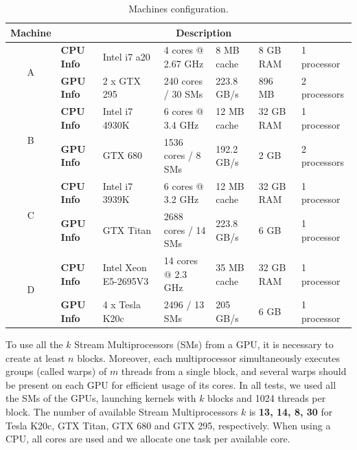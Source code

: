 \documentclass[journal]{IEEEtran}
\begin{document}
\begin{table}[t]
\begin{scriptsize}
\caption{Machines configuration.\label{table:machines}}
\begin{center}

\begin{tabular}{|c|l|l|l|l|l|l|} \hline
\multicolumn{1}{|l|}{Machine} & \multicolumn{6}{|c|}{\textbf{Description}}                                                           \\ \hline
\multirow{2}{*}{A}          & \textbf{CPU Info} & Intel i7 a20   & 4 cores  @ 2.67 GHz  &   8 MB cache   & 8 GB RAM   & 1 processor  \\ \cline{2-7}
                            & \textbf{GPU Info} & 2 x GTX 295    & 240 cores / 30 SMs      & 223.8 GB/s  & 896 MB          & 2 processors \\ \hline
\multirow{2}{*}{B}          & \textbf{CPU Info} & Intel i7 4930K & 6 cores    @ 3.4 GHz & 12 MB cache       & 32 GB RAM        & 1 processor  \\  \cline{2-7}
                            & \textbf{GPU Info} & GTX 680        & 1536 cores / 8 SMs & 192.2 GB/s  & 2 GB       & 2 processors \\ \hline
\multirow{2}{*}{C}          & \textbf{CPU Info} & Intel i7 3939K & 6 cores    @ 3.2 GHz & 12 MB cache & 32 GB RAM            & 1 processor  \\  \cline{2-7}
                            & \textbf{GPU Info} & GTX Titan      & 2688 cores / 14 SMs & 223.8 GB/s  & 6 GB       & 1 processor  \\ \hline
\multirow{2}{*}{D}          & \textbf{CPU Info} & Intel Xeon E5-2695V3 & 14 cores   @ 2.3 GHz &            35 MB cache           & 32 GB RAM            & 1 processor  \\  \cline{2-7}
                            & \textbf{GPU Info} & 4 x Tesla K20c & 2496 / 13 SMs       & 205 GB/s     & 6 GB                      & 1 processor           \\ \hline 
\end{tabular}
\end{center}

\end{scriptsize}
\end{table}



To use all the $k$ Stream Multiprocessors (SMs) from a GPU, it is necessary to
create at least $n$ blocks. Moreover, each multiprocessor simultaneously
executes groups (called warps) of $m$ threads from a single block, and several
warps should be present on each GPU for efficient usage of its cores. In all
tests, we used all the SMs of the GPUs, launching kernels with $k$ blocks and
1024 threads per block. The number of available Stream Multiprocessors $k$ is \textbf{13, 14, 8, 30} for
Tesla K20c, GTX Titan, GTX 680 and GTX 295, respectively. When using a CPU, all cores are used and we allocate one task per available core.
\end{document}
